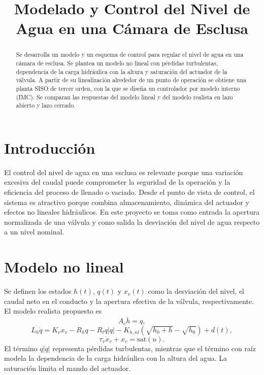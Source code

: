\documentclass[conference]{IEEEtran}
\title{Modelado y Control del Nivel de Agua en una C\'amara de Esclusa}
\author{
\IEEEauthorblockN{Nombre 1, Nombre 2}
\IEEEauthorblockA{
Universidad de los Andes, Bogot\'a, Colombia\\
correo1@uniandes.edu.co, correo2@uniandes.edu.co}
}
\begin{document}
\maketitle

\begin{abstract}
Se desarrolla un modelo y un esquema de control para regular el nivel de agua en una c\'amara de esclusa. Se plantea un modelo no lineal con p\'erdidas turbulentas, dependencia de la carga hidr\'aulica con la altura y saturaci\'on del actuador de la v\'alvula. A partir de su linealizaci\'on alrededor de un punto de operaci\'on se obtiene una planta SISO de tercer orden, con la que se dise\~na un controlador por modelo interno (IMC). Se comparan las respuestas del modelo lineal y del modelo realista en lazo abierto y lazo cerrado.
\end{abstract}

\section{Introducci\'on}
El control del nivel de agua en una esclusa es relevante porque una variaci\'on excesiva del caudal puede comprometer la seguridad de la operaci\'on y la eficiencia del proceso de llenado o vaciado. Desde el punto de vista de control, el sistema es atractivo porque combina almacenamiento, din\'amica del actuador y efectos no lineales hidr\'aulicos. En este proyecto se toma como entrada la apertura normalizada de una v\'alvula y como salida la desviaci\'on del nivel de agua respecto a un nivel nominal.

\section{Modelo no lineal}
Se definen los estados $h(t)$, $q(t)$ y $x_v(t)$ como la desviaci\'on del nivel, el caudal neto en el conducto y la apertura efectiva de la v\'alvula, respectivamente. El modelo realista propuesto es
\begin{equation}
A_c \dot{h}=q,
\end{equation}
\begin{equation}
L_h \dot{q}=K_v x_v - R_h q - R_t q|q|
- K_{h,nl}\left(\sqrt{h_0+h}-\sqrt{h_0}\right) + d(t),
\end{equation}
\begin{equation}
\tau_v \dot{x}_v + x_v = \mathrm{sat}(u).
\end{equation}
El t\'ermino $q|q|$ representa p\'erdidas turbulentas, mientras que el t\'ermino con ra\'iz modela la dependencia de la carga hidr\'aulica con la altura del agua. La saturaci\'on limita el mando del actuador.
\end{document}
